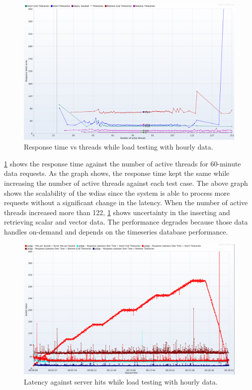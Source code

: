 \begin{figure}[htp]
    \centering
    \includegraphics[width=1.0\textwidth]{results/obs/all/obs_all_60m_response_times_vs_threads.png}
    \caption{Response time vs threads while load testing with hourly data.}
    \label{fi:test_obs_all_60m_response_vs_threads}
\end{figure}
\cref{fi:test_obs_all_60m_response_vs_threads} shows the response time against the number of active threads for 60-minute data requests. As the graph shows, the response time kept the same while increasing the number of active threads against each test case. The above graph shows the scalability of the \acrshort{wdias} since the system is able to process more requests without a significant change in the latency. When the number of active threads increased more than 122, \cref{fi:test_obs_all_60m_response_vs_threads} shows uncertainty in the inserting and retrieving scalar and vector data. The performance degrades because those data handles on-demand and depends on the timeseries database performance.

\begin{figure}[htp]
    \centering
    \includegraphics[width=1.0\textwidth]{results/obs/all/obs_all_60m_res_latencies_against_hits.png}
    \caption{Latency against server hits while load testing with hourly data.}
    \label{fi:test_obs_all_60m_latency}
\end{figure}

